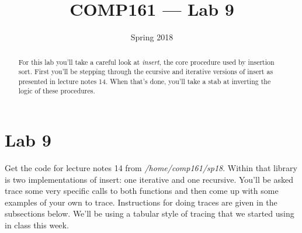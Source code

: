 \documentclass[nobib]{tufte-handout}
\title{COMP161 --- Lab 9}
\author{}
\date{Spring 2018}
\begin{document}
\maketitle

\begin{abstract}
For this lab you'll take a careful look at \textit{insert}, the core procedure used by insertion sort. First you'll be stepping through the ecursive and iterative versions of insert as presented in lecture notes 14. When that's done, you'll take a stab at inverting the logic of these procedures.
\end{abstract}

\section{Lab 9}

Get the code for lecture notes 14 from \textit{/home/comp161/sp18}. Within that library is two implementations of insert: one iterative and one recursive. You'll be asked trace some very specific calls to both functions and then come up with some examples of your own to trace. Instructions for doing traces are given in the subsections below. We'll be using a tabular style of tracing that we started using in class this week.
\end{document}

